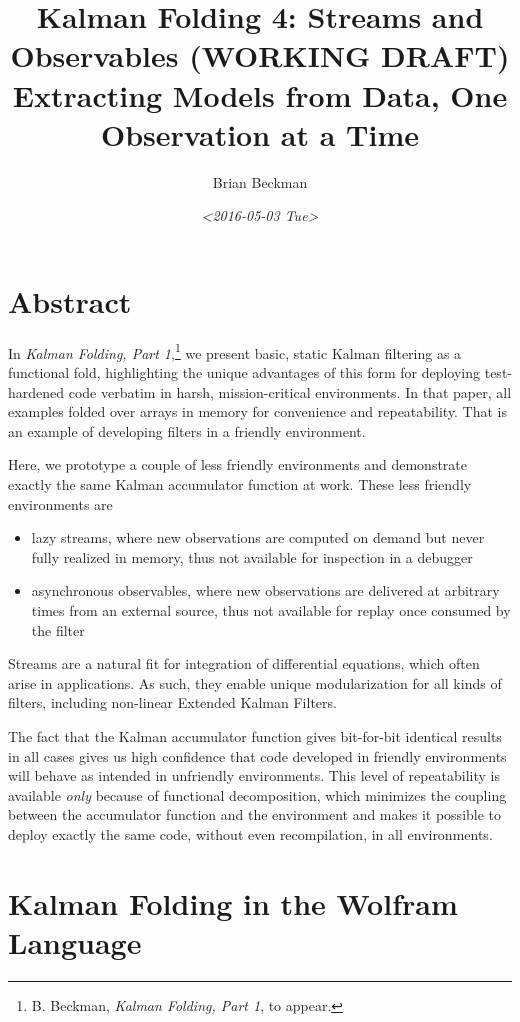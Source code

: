 \documentclass[10pt,oneside,x11names]{article}
\author{Brian Beckman}
\date{\textit{<2016-05-03 Tue>}}
\title{Kalman Folding 4: Streams and Observables (WORKING DRAFT)\\\medskip
\large Extracting Models from Data, One Observation at a Time}
\begin{document}
\maketitle
\setcounter{tocdepth}{2}
\tableofcontents


\section{Abstract}
\label{sec:orgheadline1}

In \emph{Kalman Folding, Part 1},\footnote{B. Beckman, \emph{Kalman Folding, Part 1}, to appear.} we present basic, static Kalman filtering
as a functional fold, highlighting the unique advantages of this form for
deploying test-hardened code verbatim in harsh, mission-critical environments.
In that paper, all examples folded over arrays in memory for convenience and
repeatability. That is an example of developing filters in a friendly
environment.

Here, we prototype a couple of less friendly environments and demonstrate
exactly the same Kalman accumulator function at work. These less friendly
environments are
\begin{itemize}
\item lazy streams, where new observations are computed on demand but never fully
realized in memory, thus not available for inspection in a debugger
\item asynchronous observables, where new observations are delivered at arbitrary
times from an external source, thus not available for replay once consumed by
the filter
\end{itemize}

Streams are a natural fit for integration of differential equations, which often
arise in applications. As such, they enable unique modularization for all kinds
of filters, including non-linear Extended Kalman Filters.

The fact that the Kalman accumulator function gives bit-for-bit identical
results in all cases gives us high confidence that code developed in friendly
environments will behave as intended in unfriendly environments. This level of
repeatability is available \emph{only} because of functional decomposition, which
minimizes the coupling between the accumulator function and the environment and
makes it possible to deploy exactly the same code, without even recompilation,
in all environments.

\section{Kalman Folding in the Wolfram Language}
\label{sec:orgheadline3}
\end{document}
